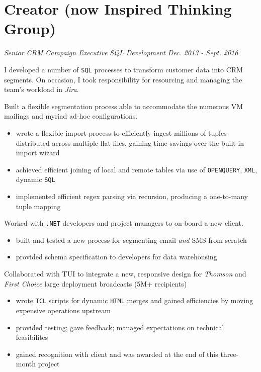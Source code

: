 \documentclass[letterpaper,11pt]{article}
\begin{document}
\section{Creator (now Inspired Thinking Group)}
\textit{Senior CRM Campaign Executive}
\hfill
\textit{SQL Development}
\hfill
\textit{Dec. 2013 - Sept. 2016}
\begin{paragraph}
	I developed a number of \texttt{SQL} processes to transform customer data into CRM segments. On occasion, I took responsibility for resourcing and managing the team's workload in \textit{Jira}.
\end{paragraph}
\begin{description}[style=multiline,leftmargin=3cm]
	\item[Virgin Media Segmentation \tiny\textnormal{\href{https://adrian.ng/SQL/recursion}{adrian.ng/SQL/recursion}} \textnormal{\href{https://adrian.ng/openquery-xml}{adrian.ng/openquery-xml}}]
	      Built a flexible segmentation process able to accommodate the numerous VM mailings and myriad ad-hoc configurations.
	      \begin{itemize}
		      \item wrote a flexible import process to efficiently ingest millions of tuples distributed across multiple flat-files, gaining time-savings over the built-in import wizard
		      \item achieved efficient joining of local and remote tables via use of \texttt{OPENQUERY}, \texttt{XML}, dynamic \texttt{SQL}
		      \item implemented efficient regex parsing via recursion, producing a one-to-many tuple mapping
	      \end{itemize}
	\item[Volkswagen Onboarding]
	      Worked with \texttt{.NET} developers and project managers to on-board a new client.
	      \begin{itemize}
		      \item built and tested a new process for segmenting email \textit{and} SMS from scratch
		      \item provided schema specification to developers for data warehousing
	      \end{itemize}
	\item[TUI Redesign]
	      Collaborated with TUI to integrate a new, responsive design for \textit{Thomson} and \textit{First Choice} large deployment broadcasts (5M+ recipients)
	      \begin{itemize}
		      \item wrote \texttt{TCL} scripts for dynamic \texttt{HTML} merges and gained efficiencies by moving expensive operations upstream
		      \item provided testing; gave feedback; managed expectations on technical feasibilites
		      \item gained recognition with client and was awarded at the end of this three-month project
	      \end{itemize}
\end{description}
\end{document}

